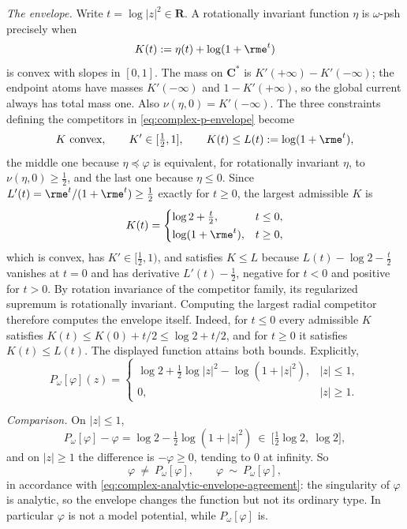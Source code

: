 \begin{example}
\emph{The envelope.}  Write $t=\log|z|^2\in\mathbf R$.  A rotationally
invariant function $\eta$ is $\omega$-psh precisely when
\[
 K(t):=\eta(t)+\log(1+\rme^{t})
\]
is convex with slopes in $[0,1]$.  The mass on $\mathbf C^*$ is
$K'(+\infty)-K'(-\infty)$; the endpoint atoms have masses
$K'(-\infty)$ and $1-K'(+\infty)$, so the global current always has
total mass one.  Also
$\nu(\eta,0)=K'(-\infty)$.  The three constraints defining the
competitors in \eqref{eq:complex-p-envelope} become
\[
 K\ \text{convex},\qquad
 K'\in[\tfrac12,1],\qquad
 K(t)\leq L(t):=\log(1+\rme^{t}),
\]
the middle one because $\eta\preceq\varphi$ is equivalent, for
rotationally invariant $\eta$, to $\nu(\eta,0)\geq\frac12$, and the
last one because $\eta\leq0$.  Since $L'(t)=\rme^t/(1+\rme^t)\geq
\frac12$ exactly for $t\geq0$, the largest admissible $K$ is
\[
 K(t)=
 \begin{cases}
 \log2+\tfrac t2, & t\leq0,\\[2pt]
 \log(1+\rme^t), & t\geq0,
 \end{cases}
\]
which is convex, has $K'\in[\frac12,1)$, and satisfies $K\leq L$
because $L(t)-\log2-\frac t2$ vanishes at $t=0$ and has derivative
$L'(t)-\frac12$, negative for $t<0$ and positive for $t>0$.  By
rotation invariance of the competitor family, its regularized
supremum is rotationally invariant.  Computing the largest radial
competitor therefore computes the envelope itself.  Indeed, for
$t\leq0$ every admissible $K$ satisfies
$K(t)\leq K(0)+t/2\leq\log2+t/2$, and for $t\geq0$ it satisfies
$K(t)\leq L(t)$.  The displayed function attains both bounds.  Explicitly,
\[
 P_\omega[\varphi](z)=
 \begin{cases}
 \log2+\tfrac12\log|z|^2-\log(1+|z|^2), & |z|\leq1,\\[3pt]
 0, & |z|\geq1 .
 \end{cases}
\]

\emph{Comparison.}  On $|z|\leq1$,
\[
 P_\omega[\varphi]-\varphi
 =\log2-\tfrac12\log(1+|z|^2)
 \ \in\ \bigl[\tfrac12\log2,\ \log2\bigr],
\]
and on $|z|\geq1$ the difference is
$-\varphi\geq0$, tending to $0$ at infinity.  So
\[
 \varphi\ \neq\ P_\omega[\varphi],
 \qquad
 \varphi\ \sim\ P_\omega[\varphi],
\]
in accordance with \eqref{eq:complex-analytic-envelope-agreement}: the
singularity of $\varphi$ is analytic, so the envelope changes the
function but not its ordinary type.  In particular $\varphi$ is not a
model potential, while $P_\omega[\varphi]$ is.


\end{example}
